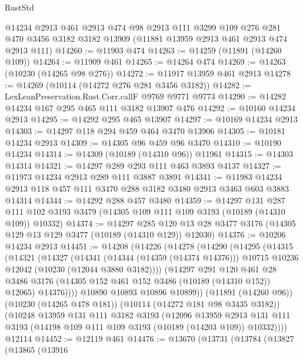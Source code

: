 \begin{lexlean}{RustStd}
\begin{coremodule}
    @14234
    @2913
    @461
    @2913
    @474
    @98
    @2913
    @111
    @3299
    @109
    @276
    @281
    @470
    @3456
    @3182
    @3182
    @13909
    (@11881 @13959 @2913 @461 @2913 @474 @2913 @111)
@14260 := @11903 @474
@14263 := @14259 (@11891 (@14260 @109))
@14264 := @11909 @461
@14265 := @14264 @474
@14269 := @14263 (@10230 (@14265 @98 @276))
@14272 := @11917 @13959 @461 @2913
@14278 := @14269 (@10114 (@14272 @276 @281 @3456 @3182))
@14282 := LexLeanPreservation.Rust.Corr.callF @9769 @9771 @9773
@14290 := @14282 @14234 @167 @295 @465 @111 @3182 @13907 @476
@14292 := @10160 @14234 @2913
@14295 := @14292 @295 @465 @13907
@14297 := @10169 @14234 @2913
@14303 := @14297 @118 @294 @459 @464 @3470 @13906
@14305 := @10181 @14234 @2913
@14309 := @14305 @96 @459 @96 @3470
@14310 := @10190 @14234
@14314 := @14309 (@10189 (@14310 @96)) @11961
@14315 := @14303 @14314
@14321 := @14297 @289 @293 @111 @463 @3893 @4137
@14327 := @11973 @14234 @2913 @289 @111 @3887 @3891
@14341 := @11983 @14234 @2913 @118 @457 @111 @3470 @288 @3182 @3480 @2913 @3463 @603 @3883 @14314
@14344 := @14292 @288 @457 @3480
@14359 := @14297
    @131
    @287
    @111
    @102
    @3193
    @3479
    (@14305 @109 @111 @109 @3193 (@10189 (@14310 @109)) @10332)
@14374 := @14297
    @285
    @120
    @13
    @28
    @3477
    @3176
    (@14305 @129 @13 @129 @3477 (@10189 (@14310 @129)) @12030)
@14376 := @10206 @14234 @2913
@14451 := @14208
    (@14226
      (@14278
        (@14290
          (@14295
            (@14315
              (@14321
                (@14327
                  (@14341
                    (@14344 (@14359 (@14374 @14376)))
                    @10715
                    @10236
                    @12042
                    (@10230 (@12044 @3880 @3182))))
                (@14297
                  @291
                  @120
                  @461
                  @28
                  @3486
                  @3176
                  (@14305 @152 @461 @152 @3486 (@10189 (@14310 @152)) @12065)
                  @14376))))
          @10890
          @10893
          @10896
          @10899))
      (@11891 (@14260 @96))
      (@10230 (@14265 @478 @181))
      (@10114 (@14272 @181 @98 @3435 @3182))
      (@10248
        @13959
        @131
        @111
        @3182
        @3193
        (@12096
          @13959
          @2913
          @131
          @111
          @3193
          (@14198 @109 @111 @109 @3193 (@10189 (@14203 @109)) @10332))))
    @12114
@14452 := @12119 @461
@14476 := @13670
    (@13731
      (@13784
        (@13827
          (@13865
            (@13916

\end{coremodule}
\end{lexlean}
